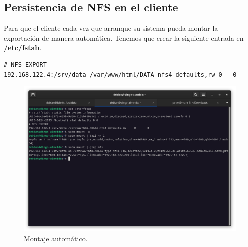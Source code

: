 \subsection{Persistencia de NFS en el cliente}

Para que el cliente cada vez que arranque su sistema pueda montar la exportación de manera automática. Tenemos que crear la siguiente entrada en \textbf{/etc/fstab}.
\begin{lstlisting}[style=mybash]
# NFS EXPORT
192.168.122.4:/srv/data /var/www/html/DATA nfs4 defaults,rw	0	0
\end{lstlisting}

\begin{figure}[H]
	\centering
	\includegraphics[scale=0.30]{06}
	\caption{Montaje automático.}
\end{figure}





%



%


